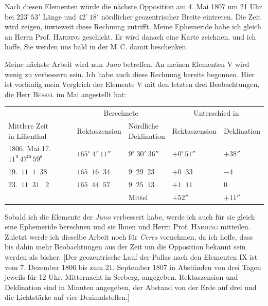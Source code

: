\par\indent Nach diesen Elementen würde die nächste Opposition am 4. Mai 1807 um 21 Uhr bei $223^\circ\,53'$ Länge und $42^\circ\,18'$ nördlicher geozentrischer Breite eintreten. Die Zeit wird zeigen, inwieweit diese Rechnung zutrifft. Meine Ephemeride habe ich gleich an Herrn Prof. \textsc{Harding} geschickt. Er wird danach eine Karte zeichnen, und ich hoffe, Sie werden uns bald in der M.\,C. damit beschenken.
%
\par\indent Meine nächste Arbeit wird nun \emph{Juno} betreffen. An meinen Elementen V wird wenig zu verbessern sein. Ich habe auch diese Rechnung bereits begonnen. Hier ist vorläufig mein Vergleich der Elemente V mit den letzten drei Beobachtungen, die Herr \textsc{Bessel} im Mai angestellt hat:

\begin{center}\begingroup
\fontsize{9}{11}\selectfont
\setlength{\tabcolsep}{2pt}\renewcommand{\arraystretch}{1.12}
\begin{tabular}{l|l|l|l|l}
& \multicolumn{2}{c|}{Berechnete} & \multicolumn{2}{c}{Unterschied in} \\
\shortstack{Mittlere Zeit\\in Lilienthal} & Rektaszension & \shortstack{Nördliche\\Deklination} & Rektaszension & Deklination \\
\hline
1806. Mai 17.\ $11^{\mathrm{u}}\,47^{\mathrm{m}}\,59^{\mathrm{s}}$ & $165^\circ\;4'\;11''$ & $9^\circ\;30'\;36''$ & $+0'\,51''$ & $+38''$ \\
19.\ $11\;\;1\;\;38$ & $165\;\;16\;\;34$ & $9\;\;29\;\;23$ & $+0\;\;33$ & $-4$ \\
23.\ $11\;\;31\;\;\;2$ & $165\;\;44\;\;57$ & $9\;\;25\;\;13$ & $+1\;\;11$ & $0$ \\
\cline{3-5}
& & Mittel & $+52''$ & $+11''$ \\
\end{tabular}\endgroup\end{center}

\par\indent Sobald ich die Elemente der \emph{Juno} verbessert habe, werde ich auch für sie gleich eine Ephemeride berechnen und sie Ihnen und Herrn Prof. \textsc{Harding} mitteilen. Zuletzt werde ich dieselbe Arbeit noch für \emph{Ceres} vornehmen, da ich hoffe, dass bis dahin mehr Beobachtungen aus der Zeit um die Opposition bekannt sein werden als bisher. [Der geozentrische Lauf der Pallas nach den Elementen IX ist vom 7. Dezember 1806 bis zum 21. September 1807 in Abständen von drei Tagen jeweils für 12 Uhr, Mitternacht in Seeberg, angegeben. Rektaszension und Deklination sind in Minuten angegeben, der Abstand von der Erde auf drei und die Lichtstärke auf vier Dezimalstellen.]
